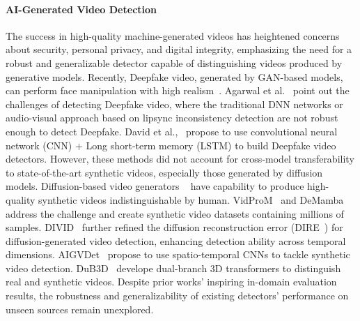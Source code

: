 \paragraph{\textbf{AI-Generated Video Detection}}
The success in high-quality machine-generated videos has heightened concerns about security, personal privacy, and digital integrity, emphasizing the need for a robust and generalizable detector capable of distinguishing videos produced by generative models.
Recently, Deepfake video, generated by GAN-based models, can perform face manipulation with high realism~\cite{deepfake_pavel}. Agarwal et al.~\cite{deepfake_pavel} point out the challenges of detecting Deepfake video, where the traditional DNN networks or audio-visual approach based on lipsync inconsistency detection are not robust enough to detect Deepfake. David et al.,~\cite{8639163_deepfake} propose to use convolutional neural network (CNN) + Long short-term memory (LSTM) to build Deepfake video detectors. However, these methods did not account for cross-model transferability to state-of-the-art synthetic videos, especially those generated by diffusion models. Diffusion-based video generators ~\cite{opensora,blattmann2023stablevideodiffusionscaling,klingai,runway3,pika} have capability to produce high-quality synthetic videos indistinguishable by human. VidProM~\cite{wang2024vidprommillionscalerealpromptgallery} and DeMamba~\cite{chen2024demambaaigeneratedvideodetection} address the challenge and create synthetic video datasets containing millions of samples. DIVID~\cite{liu2024turnsimrealrobust} further refined the diffusion reconstruction error (DIRE~\cite{wang2023dire}) for diffusion-generated video detection, enhancing detection ability across temporal dimensions. AIGVDet~\cite{bai2024aigeneratedvideodetectionspatiotemporal} propose to use spatio-temporal CNNs to tackle synthetic video detection.  DuB3D~\cite{ji2024distinguishfakevideosunleashing} develope dual-branch 3D transformers to distinguish real and synthetic videos. Despite prior works' inspiring in-domain evaluation results, the robustness and generalizability of existing detectors' performance on unseen sources remain unexplored.


